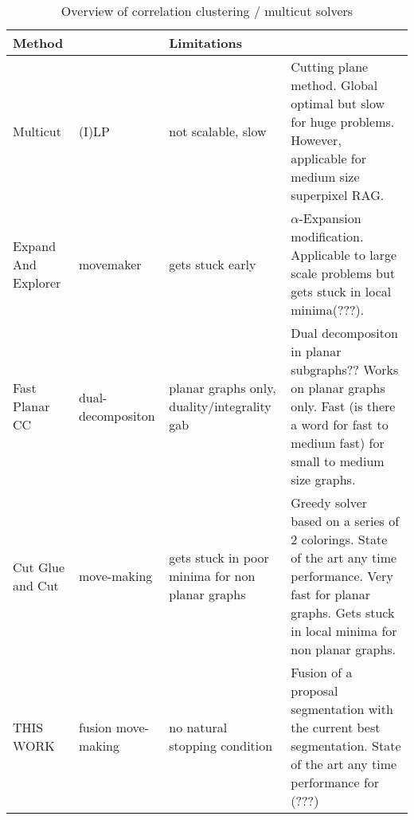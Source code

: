 \begin{table}
\begin{center}
    \begin{tiny}
    \begin{tabular}{ p{1cm} p{1cm} p{1.5cm} p{2.5cm} }
    \hline
    \hline
    Method &    & Limitations &   \\ \hline
    Multicut \cite{andres_2011_iccv,kappes_2011_emmcvpr} & 
        (I)LP & 
        not scalable, slow &
        Cutting plane method.
        Global optimal but slow for huge problems. 
        However, applicable for medium size superpixel RAG. 
        \\ \hline
    Expand And Explorer \cite{bagon_2011_arxiv} & 
        movemaker & 
        gets stuck early &
        $\alpha$-Expansion modification. Applicable to
        large scale problems but gets stuck in local minima(???).
        \\ \hline
    Fast Planar CC \cite{yarkony_2012_eccv} & 
        dual-decompositon & 
        planar graphs only, 
        duality/integrality gab &
        Dual decompositon in planar subgraphs??
        Works on planar graphs only. Fast (is there a word for fast to medium fast) for
        small to medium size graphs.
        \\ \hline
    Cut Glue and Cut \cite{beier_2014_cvpr} & 
        move-making & 
        gets stuck in poor minima for non planar graphs &
        Greedy solver based on a series of 2 colorings.
        State of the art any time performance. Very
        fast for planar graphs. Gets stuck in local minima
        for non planar graphs.
        \\ \hline
    THIS WORK & 
        fusion move-making & 
        no natural stopping condition &
        Fusion of a proposal segmentation with
        the current best segmentation.
        State of the art any time performance for (???)
        \\ \hline
        \hline
    \end{tabular}
    \end{tiny}
\end{center}
\caption{
    Overview of correlation clustering / multicut solvers
}
\end{table}
